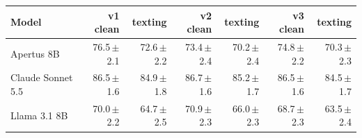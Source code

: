 \begin{tabular}{lrrrrrr}
\toprule
Model & v1 clean & texting & v2 clean & texting & v3 clean & texting \\
\midrule
Apertus 8B & 76.5\,{\scriptsize$\pm$2.1} & 72.6\,{\scriptsize$\pm$2.2} & 73.4\,{\scriptsize$\pm$2.4} & 70.2\,{\scriptsize$\pm$2.4} & 74.8\,{\scriptsize$\pm$2.2} & 70.3\,{\scriptsize$\pm$2.3} \\
Claude Sonnet 5.5 & 86.5\,{\scriptsize$\pm$1.6} & 84.9\,{\scriptsize$\pm$1.8} & 86.7\,{\scriptsize$\pm$1.6} & 85.2\,{\scriptsize$\pm$1.7} & 86.5\,{\scriptsize$\pm$1.6} & 84.5\,{\scriptsize$\pm$1.7} \\
Llama 3.1 8B & 70.0\,{\scriptsize$\pm$2.2} & 64.7\,{\scriptsize$\pm$2.5} & 70.9\,{\scriptsize$\pm$2.3} & 66.0\,{\scriptsize$\pm$2.3} & 68.7\,{\scriptsize$\pm$2.3} & 63.5\,{\scriptsize$\pm$2.4} \\
\bottomrule
\end{tabular}
